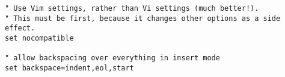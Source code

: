 \documentclass{article}
\begin{document}
\begin{verbatim}
" Use Vim settings, rather than Vi settings (much better!).
" This must be first, because it changes other options as a side effect.
set nocompatible

" allow backspacing over everything in insert mode
set backspace=indent,eol,start  
\end{verbatim}
\end{document}
